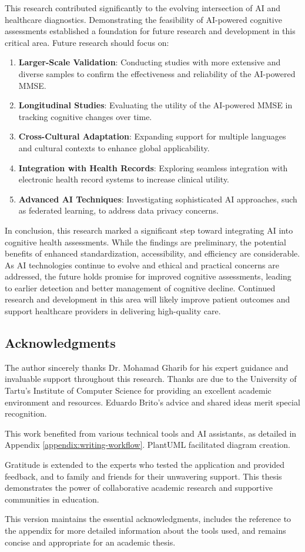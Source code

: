 This research contributed significantly to the evolving intersection of AI and healthcare diagnostics. Demonstrating the feasibility of AI-powered cognitive assessments established a foundation for future research and development in this critical area.
Future research should focus on:
\begin{enumerate}
\item \textbf{Larger-Scale Validation}: Conducting studies with more extensive and diverse samples to confirm the effectiveness and reliability of the AI-powered MMSE.
\item \textbf{Longitudinal Studies}: Evaluating the utility of the AI-powered MMSE in tracking cognitive changes over time.
\item \textbf{Cross-Cultural Adaptation}: Expanding support for multiple languages and cultural contexts to enhance global applicability.
\item \textbf{Integration with Health Records}: Exploring seamless integration with electronic health record systems to increase clinical utility.
\item \textbf{Advanced AI Techniques}: Investigating sophisticated AI approaches, such as federated learning, to address data privacy concerns.
\end{enumerate}
In conclusion, this research marked a significant step toward integrating AI into cognitive health assessments. While the findings are preliminary, the potential benefits of enhanced standardization, accessibility, and efficiency are considerable. As AI technologies continue to evolve and ethical and practical concerns are addressed, the future holds promise for improved cognitive assessments, leading to earlier detection and better management of cognitive decline. Continued research and development in this area will likely improve patient outcomes and support healthcare providers in delivering high-quality care.

\subsection*{Acknowledgments}
The author sincerely thanks Dr. Mohamad Gharib for his expert guidance and invaluable support throughout this research. Thanks are due to the University of Tartu's Institute of Computer Science for providing an excellent academic environment and resources. Eduardo Brito's advice and shared ideas merit special recognition.

This work benefited from various technical tools and AI assistants, as detailed in Appendix \ref{appendix:writing-workflow}. PlantUML facilitated diagram creation.

Gratitude is extended to the experts who tested the application and provided feedback, and to family and friends for their unwavering support. This thesis demonstrates the power of collaborative academic research and supportive communities in education.

This version maintains the essential acknowledgments, includes the reference to the appendix for more detailed information about the tools used, and remains concise and appropriate for an academic thesis.